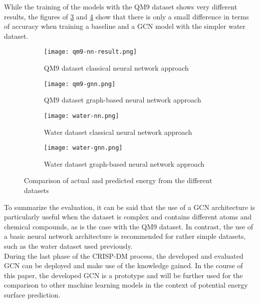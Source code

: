 While the training of the models with the QM9 dataset shows very different results, the figures of \ref{fig:sfig3} and \ref{fig:sfig4} show that there is only a small difference in terms of accuracy when training a baseline and a GCN model with the simpler water dataset.


\begin{figure}[h!]
    \begin{subfigure}{.5\textwidth}
     \captionsetup{justification=centering}
      \centering
      \texttt{[image: qm9-nn-result.png]}
      \caption{QM9 dataset classical neural network approach}
      \label{fig:sfig1}
    \end{subfigure}%
    \begin{subfigure}{.5\textwidth}
      \centering
      \captionsetup{justification=centering}
      \texttt{[image: qm9-gnn.png]}
      \caption{QM9 dataset graph-based neural network approach}
      \label{fig:sfig2}
    \end{subfigure}
    \begin{subfigure}{.5\textwidth}
        \centering
        \captionsetup{justification=centering}
        \texttt{[image: water-nn.png]}
        \caption{Water dataset classical neural network approach}
        \label{fig:sfig3}
      \end{subfigure}
      \begin{subfigure}{.5\textwidth}
        \captionsetup{justification=centering}
        \centering
        \texttt{[image: water-gnn.png]}
        \caption{Water dataset graph-based neural network approach}
        \label{fig:sfig4}
      \end{subfigure}
    \caption{Comparison of actual and predicted energy from the different datasets}
    \label{fig:plotsofresults}
    \end{figure}

To summarize the evaluation, it can be said that the use of a GCN architecture is particularly useful when the dataset is complex and contains different atoms and chemical compounds, as is the case with the QM9 dataset. In contrast, the use of a basic neural network architecture is recommended for rather simple datasets, such as the water dataset used previously. \\

During the last phase of the CRISP-DM process, the developed and evaluated GCN can be deployed and make use of the knowledge gained. In the course of this paper, the developed GCN is a prototype and will be further used for the comparison to other machine learning models in the context of potential energy surface prediction. 

